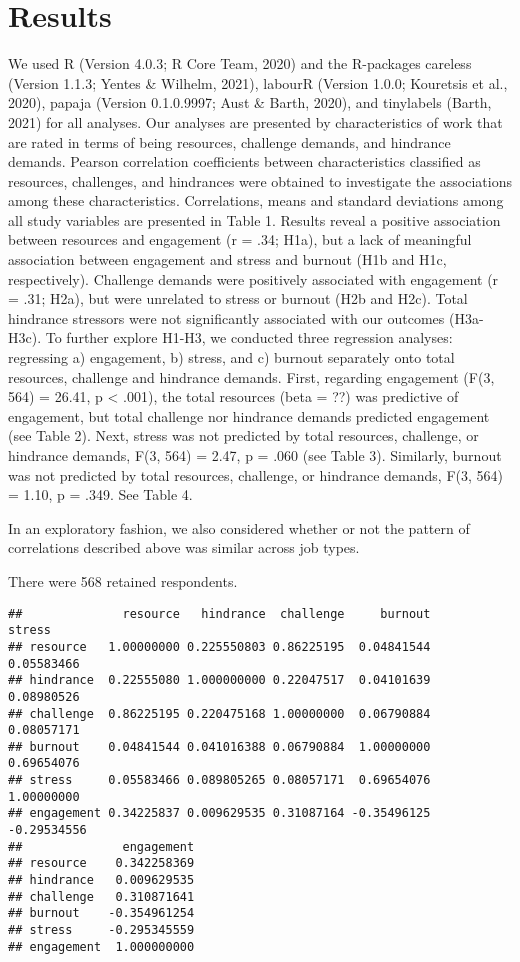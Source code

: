 \documentclass[
  man]{apa6}
\begin{document}
\hypertarget{results}{%
\section{Results}\label{results}}

We used R (Version 4.0.3; R Core Team, 2020) and the R-packages careless (Version 1.1.3; Yentes \& Wilhelm, 2021), labourR (Version 1.0.0; Kouretsis et al., 2020), papaja (Version 0.1.0.9997; Aust \& Barth, 2020), and tinylabels (Barth, 2021) for all analyses. Our analyses are presented by characteristics of work that are rated in terms of being resources, challenge demands, and hindrance demands. Pearson correlation coefficients between characteristics classified as resources, challenges, and hindrances were obtained to investigate the associations among these characteristics.
Correlations, means and standard deviations among all study variables are presented in Table 1. Results reveal a positive association between resources and engagement (r = .34; H1a), but a lack of meaningful association between engagement and stress and burnout (H1b and H1c, respectively). Challenge demands were positively associated with engagement (r = .31; H2a), but were unrelated to stress or burnout (H2b and H2c). Total hindrance stressors were not significantly associated with our outcomes (H3a-H3c). To further explore H1-H3, we conducted three regression analyses: regressing a) engagement, b) stress, and c) burnout separately onto total resources, challenge and hindrance demands. First, regarding engagement (F(3, 564) = 26.41, p \textless{} .001), the total resources (beta = ??) was predictive of engagement, but total challenge nor hindrance demands predicted engagement (see Table 2). Next, stress was not predicted by total resources, challenge, or hindrance demands, F(3, 564) = 2.47, p = .060 (see Table 3). Similarly, burnout was not predicted by total resources, challenge, or hindrance demands, F(3, 564) = 1.10, p = .349. See Table 4.

In an exploratory fashion, we also considered whether or not the pattern of correlations described above was similar across job types.

There were 568 retained respondents.

\begin{verbatim}
##              resource   hindrance  challenge     burnout      stress
## resource   1.00000000 0.225550803 0.86225195  0.04841544  0.05583466
## hindrance  0.22555080 1.000000000 0.22047517  0.04101639  0.08980526
## challenge  0.86225195 0.220475168 1.00000000  0.06790884  0.08057171
## burnout    0.04841544 0.041016388 0.06790884  1.00000000  0.69654076
## stress     0.05583466 0.089805265 0.08057171  0.69654076  1.00000000
## engagement 0.34225837 0.009629535 0.31087164 -0.35496125 -0.29534556
##              engagement
## resource    0.342258369
## hindrance   0.009629535
## challenge   0.310871641
## burnout    -0.354961254
## stress     -0.295345559
## engagement  1.000000000
\end{verbatim}
\end{document}
